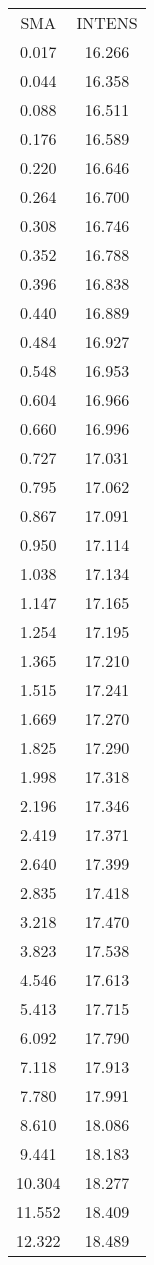 \begin{table}
\begin{tabular}{cc}
SMA & INTENS \\ 
0.017 & 16.266 \\
0.044 & 16.358 \\
0.088 & 16.511 \\
0.176 & 16.589 \\
0.220 & 16.646 \\
0.264 & 16.700 \\
0.308 & 16.746 \\
0.352 & 16.788 \\
0.396 & 16.838 \\
0.440 & 16.889 \\
0.484 & 16.927 \\
0.548 & 16.953 \\
0.604 & 16.966 \\
0.660 & 16.996 \\
0.727 & 17.031 \\
0.795 & 17.062 \\
0.867 & 17.091 \\
0.950 & 17.114 \\
1.038 & 17.134 \\
1.147 & 17.165 \\
1.254 & 17.195 \\
1.365 & 17.210 \\
1.515 & 17.241 \\
1.669 & 17.270 \\
1.825 & 17.290 \\
1.998 & 17.318 \\
2.196 & 17.346 \\
2.419 & 17.371 \\
2.640 & 17.399 \\
2.835 & 17.418 \\
3.218 & 17.470 \\
3.823 & 17.538 \\
4.546 & 17.613 \\
5.413 & 17.715 \\
6.092 & 17.790 \\
7.118 & 17.913 \\
7.780 & 17.991 \\
8.610 & 18.086 \\
9.441 & 18.183 \\
10.304 & 18.277 \\
11.552 & 18.409 \\
12.322 & 18.489 \\

\end{tabular}
\end{table}
